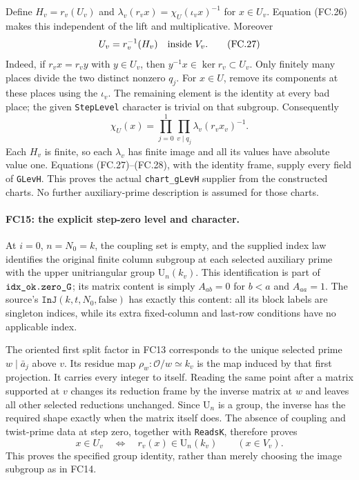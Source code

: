\documentclass[11pt,a4paper]{article}
\numberwithin{equation}{section}
\theoremstyle{remark}\newtheorem{remark}[theorem]{Remark}
\begin{document}
Define $H_v=r_v(U_v)$ and
$\lambda_v(r_vx)=\chi_U(\iota_vx)^{-1}$ for $x\in U_v$.
Equation (FC.26) makes this independent of the lift and multiplicative.
Moreover
\[
 U_v=r_v^{-1}(H_v)\quad\hbox{inside }V_v.             \tag{FC.27}
\]
Indeed, if $r_vx=r_vy$ with $y\in U_v$, then
$y^{-1}x\in\ker r_v\subset U_v$.
Only finitely many places divide the two distinct nonzero $q_j$.
For $x\in U$, remove its components at these places using the
$\iota_v$. The remaining element is the identity at every bad place;
the given \texttt{StepLevel} character is trivial on that subgroup.
Consequently
\[
 \chi_U(x)=\prod_{j=0}^1\prod_{v\mid q_j}
                  \lambda_v(r_vx_v)^{-1}.            \tag{FC.28}
\]
Each $H_v$ is finite, so each $\lambda_v$ has finite image and all
its values have absolute value one. Equations (FC.27)--(FC.28), with
the identity frame, supply every field of \texttt{GLevH}.
This proves the actual \texttt{chart\_\allowbreak gLevH} supplier from the
constructed charts. No further auxiliary-prime description is assumed
for those charts.

\paragraph{FC15: the explicit step-zero level and character.}
At $i=0$, $n=N_0=k$, the coupling set is empty, and the supplied
index law identifies the original finite column subgroup at each
selected auxiliary prime with the upper unitriangular group
$\mathrm U_n(k_v)$. This identification is part of
$\texttt{idx\_\allowbreak ok.zero\_\allowbreak G}$; its matrix content is simply
$A_{ab}=0$ for $b<a$ and $A_{aa}=1$. The source's
$\texttt{InJ}(k,t,N_0,\mathrm{false})$ has exactly this content:
all its block labels are singleton indices, while its extra fixed-column
and last-row conditions have no applicable index.

The oriented first split factor in FC13 corresponds to the unique
selected prime $w\mid\bar a_j$ above $v$. Its residue map
$\rho_w:\mathcal O/w\simeq k_v$ is the map induced by that
first projection. It carries every integer to itself. Reading the
same point after a matrix supported at $v$ changes its reduction frame
by the inverse matrix at $w$ and leaves all other selected reductions
unchanged. Since $\mathrm U_n$ is a group, the inverse has the
required shape exactly when the matrix itself does. The absence of
coupling and twist-prime data at step zero, together with \texttt{ReadsK},
therefore proves
\[
 x\in U_v\quad\Longleftrightarrow\quad
 r_v(x)\in\mathrm U_n(k_v)\qquad(x\in V_v).          \tag{FC.29}
\]
This proves the specified group identity, rather than merely choosing
the image subgroup as in FC14.
\end{document}
